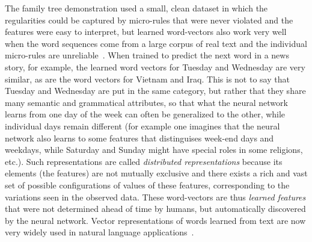 \documentclass[10pts]{article}
\begin{document}
The family tree demonstration used a small, clean dataset in which the
regularities could be captured by micro-rules that were never violated
and the features were easy to interpret, but learned word-vectors also
work very well when the word sequences come from a large corpus of
real text and the individual micro-rules are
unreliable~\citep{BenDucVin01-short}. When trained to predict the next
word in a news story, for example, the learned word vectors for
Tuesday and Wednesday are very similar, as are the word vectors for
Vietnam and Iraq. This is not to say that Tuesday and Wednesday are
put in the same category, but rather that they share many semantic and
grammatical attributes, so that what the neural network learns from
one day of the week can often be generalized to the other, while
individual days remain different (for example one imagines that the
neural network also learns to some features that distinguises week-end
days and weekdays, while Saturday and Sunday might have special roles
in some religions, etc.).  Such representations are called {\em
  distributed representations} because its elements (the features) are
not mutually exclusive and there exists a rich and vast set of
possible configurations of values of these features, corresponding to
the variations seen in the observed data.  These word-vectors are thus
{\em learned features} that were not determined ahead of time by
humans, but automatically discovered by the neural network.  Vector
representations of words learned from text are now very widely used in
natural language
applications~\citep{Schwenk-2007,collobert:2011b,Socher-2011,
  Mikolov-et-al-NIPS2013,Bahdanau-et-al-arxiv2014,Sutskever-et-al-NIPS2014}.
\end{document}
